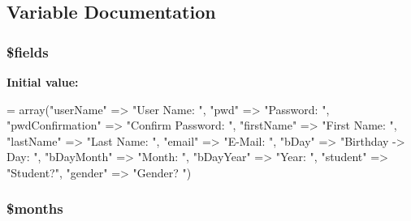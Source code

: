 \subsection{Variable Documentation}
\hypertarget{_m_c_mcreate_new_account_8php_ab2303c817e3b402b77b7f99627b9c319}{
\subsubsection[{\$fields}]{\setlength{\rightskip}{0pt plus 5cm}\$fields}}\label{_m_c_mcreate_new_account_8php_ab2303c817e3b402b77b7f99627b9c319}
{\bfseries Initial value\-:}
\begin{DoxyCode}
= array(\textcolor{stringliteral}{"userName"} => \textcolor{stringliteral}{"User Name: "},
                        \textcolor{stringliteral}{"pwd"} => \textcolor{stringliteral}{"Password: "},
                        \textcolor{stringliteral}{"pwdConfirmation"} => \textcolor{stringliteral}{"Confirm Password: "},
                        \textcolor{stringliteral}{"firstName"} => \textcolor{stringliteral}{"First Name: "},
                        \textcolor{stringliteral}{"lastName"} => \textcolor{stringliteral}{"Last Name: "},
                        \textcolor{stringliteral}{"email"} => \textcolor{stringliteral}{"E-Mail: "},
                        \textcolor{stringliteral}{"bDay"} => \textcolor{stringliteral}{"Birthday -> Day: "},
                        \textcolor{stringliteral}{"bDayMonth"} => \textcolor{stringliteral}{"Month: "},
                        \textcolor{stringliteral}{"bDayYear"} => \textcolor{stringliteral}{"Year: "},
                        \textcolor{stringliteral}{"student"} => \textcolor{stringliteral}{"Student?"},
                        \textcolor{stringliteral}{"gender"} => \textcolor{stringliteral}{"Gender? "})
\end{DoxyCode}
\hypertarget{_m_c_mcreate_new_account_8php_a88a8980708982166840708b055e335b8}{
\subsubsection[{\$months}]{\setlength{\rightskip}{0pt plus 5cm}\$months}}\label{_m_c_mcreate_new_account_8php_a88a8980708982166840708b055e335b8}
